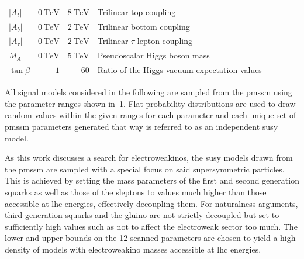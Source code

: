 \begin{table}[h]
\begin{tabular} {l r r l}
		\midrule
		$\vert A_t\vert$ & $\SI{0}{\TeV}$ & $\SI{8}{\TeV}$ & Trilinear top coupling \\
		$\vert A_b\vert$ & $\SI{0}{\TeV}$ & $\SI{2}{\TeV}$ & Trilinear bottom coupling \\
		$\vert A_\tau\vert$ & $\SI{0}{\TeV}$ & $\SI{2}{\TeV}$ & Trilinear $\tau$ lepton coupling \\
		$M_A$ & $\SI{0}{\TeV}$ & $\SI{5}{\TeV}$ & Pseudoscalar Higgs boson mass \\
		$\tan\beta$ & $1$ & $60$ & Ratio of the Higgs vacuum expectation values \\
		\bottomrule
	\end{tabular}

	\label{fig:pmssm_scan_ranges}   
\end{table}

All signal models considered in the following are sampled from the \gls{pmssm} using the parameter ranges shown in~\cref{fig:pmssm_scan_ranges}. Flat probability distributions are used to draw random values within the given ranges for each parameter and each unique set of \gls{pmssm} parameters generated that way is referred to as an independent \gls{susy} model. 

As this work discusses a search for electroweakinos, the \gls{susy} models drawn from the \gls{pmssm} are sampled with a special focus on said supersymmetric particles. This is achieved by setting the mass parameters of the first and second generation squarks as well as those of the sleptons to values much higher than those accessible at \gls{lhc} energies, effectively decoupling them. For naturalness arguments, third generation squarks and the gluino are not strictly decoupled but set to sufficiently high values such as not to affect the electroweak sector too much. The lower and upper bounds on the 12 scanned parameters are chosen to yield a high density of models with electroweakino masses accessible at \gls{lhc} energies. 

